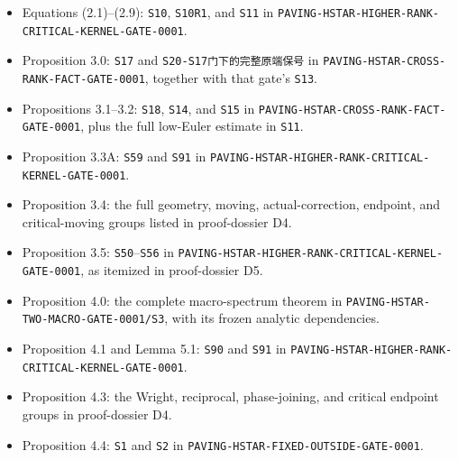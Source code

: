 \documentclass[10pt]{article}
\begin{document}
\begin{itemize}
\item Equations (2.1)--(2.9): \texttt{S10}, \texttt{S10R1}, and \texttt{S11} in
\texttt{PAVING-\allowbreak{}HSTAR-\allowbreak{}HIGHER-\allowbreak{}RANK-\allowbreak{}CRITICAL-\allowbreak{}KERNEL-\allowbreak{}GATE-\allowbreak{}0001}.
\item Proposition 3.0: \texttt{S17} and \texttt{S20-\allowbreak{}S17{\cjkfont 门\allowbreak{}下\allowbreak{}的\allowbreak{}完\allowbreak{}整\allowbreak{}原\allowbreak{}端\allowbreak{}保\allowbreak{}号}} in
\texttt{PAVING-\allowbreak{}HSTAR-\allowbreak{}CROSS-\allowbreak{}RANK-\allowbreak{}FACT-\allowbreak{}GATE-\allowbreak{}0001}, together with that gate's \texttt{S13}.
\item Propositions 3.1--3.2: \texttt{S18}, \texttt{S14}, and \texttt{S15} in
\texttt{PAVING-\allowbreak{}HSTAR-\allowbreak{}CROSS-\allowbreak{}RANK-\allowbreak{}FACT-\allowbreak{}GATE-\allowbreak{}0001}, plus the full low-Euler estimate
in \texttt{S11}.
\item Proposition 3.3A: \texttt{S59} and \texttt{S91} in
\texttt{PAVING-\allowbreak{}HSTAR-\allowbreak{}HIGHER-\allowbreak{}RANK-\allowbreak{}CRITICAL-\allowbreak{}KERNEL-\allowbreak{}GATE-\allowbreak{}0001}.
\item Proposition 3.4: the full geometry, moving, actual-correction, endpoint, and
critical-moving groups listed in proof-dossier D4.
\item Proposition 3.5: \texttt{S50}--\texttt{S56} in
\texttt{PAVING-\allowbreak{}HSTAR-\allowbreak{}HIGHER-\allowbreak{}RANK-\allowbreak{}CRITICAL-\allowbreak{}KERNEL-\allowbreak{}GATE-\allowbreak{}0001}, as itemized in
proof-dossier D5.
\item Proposition 4.0: the complete macro-spectrum theorem in
\texttt{PAVING-\allowbreak{}HSTAR-\allowbreak{}TWO-\allowbreak{}MACRO-\allowbreak{}GATE-\allowbreak{}0001/\allowbreak{}S3}, with its frozen analytic dependencies.
\item Proposition 4.1 and Lemma 5.1: \texttt{S90} and \texttt{S91} in
\texttt{PAVING-\allowbreak{}HSTAR-\allowbreak{}HIGHER-\allowbreak{}RANK-\allowbreak{}CRITICAL-\allowbreak{}KERNEL-\allowbreak{}GATE-\allowbreak{}0001}.
\item Proposition 4.3: the Wright, reciprocal, phase-joining, and critical endpoint
groups in proof-dossier D4.
\item Proposition 4.4: \texttt{S1} and \texttt{S2} in
\texttt{PAVING-\allowbreak{}HSTAR-\allowbreak{}FIXED-\allowbreak{}OUTSIDE-\allowbreak{}GATE-\allowbreak{}0001}.

\end{itemize}
\end{document}
